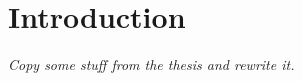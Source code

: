 







\chapter{Introduction}
\label{chap:intro}


\emph{Copy some stuff from the thesis and rewrite it.}
    



